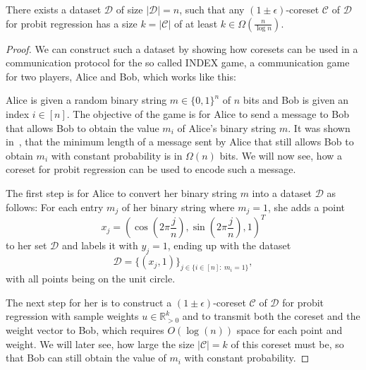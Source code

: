 \begin{theorem}
    \label{theorem:index}
    There exists a dataset $\mathcal{D}$ of size
    $|\mathcal{D}| = n$, such
    that any $(1 \pm \epsilon)$-coreset $\mathcal{C}$ of $\mathcal{D}$
    for probit regression has a size $k = |\mathcal{C}|$
    of at least $k \in \Omega\left(\frac{n}{\log{n}}\right)$.
\end{theorem}
\begin{proof}
    We can construct such a  dataset by showing
    how coresets can be used in a
    communication protocol for the so called INDEX game,
    a communication game for two players, Alice and Bob, which
    works like this:

    Alice is given a random binary string $m \in \{0, 1\}^n$ of $n$ bits
    and Bob is given an index $i \in [n]$.
    The objective of the game is for Alice to send a message to Bob that allows
    Bob to obtain the value $m_i$ of Alice's binary string $m$.
    It was shown in~\cite{index}, that the minimum length of a message
    sent by Alice that still allows Bob to obtain $m_i$ with
    constant probability is in $\Omega(n)$ bits.
    We will now see, how a coreset for probit regression can be used
    to encode such a message.

    The first step is for Alice to convert her binary string $m$ into
    a dataset $\mathcal{D}$ as follows:
    For each entry $m_j$ of her binary string where $m_j = 1$, she adds
    a point
    \begin{equation*}
        x_j = \left( \cos{\left(2 \pi \frac{j}{n}\right)},
        \sin{\left(2 \pi \frac{j}{n}\right)}, 1 \right)^T
    \end{equation*}
    to her set $\mathcal{D}$ and labels it with $y_j = 1$,
    ending up with the dataset
    \begin{equation*}
        \mathcal{D} = \{(x_j, 1)\}_{j \in \{i \in [n]:\ m_i = 1 \}},
    \end{equation*}
    with all points being on the unit circle.

    The next step for her is to construct a
    $(1 \pm \epsilon)$-coreset $\mathcal{C}$ of $\mathcal{D}$
    for probit regression with sample weights $u \in \mathbb{R}^k_{>0}$
    and to transmit both the coreset and the weight vector to Bob,
    which requires $O(\log(n))$ space for each point and
    weight.
    We will later see, how
    large the size $|\mathcal{C}|=k$ of this coreset must be,
    so that Bob can still
    obtain the value of $m_i$ with constant probability.


\end{proof}
